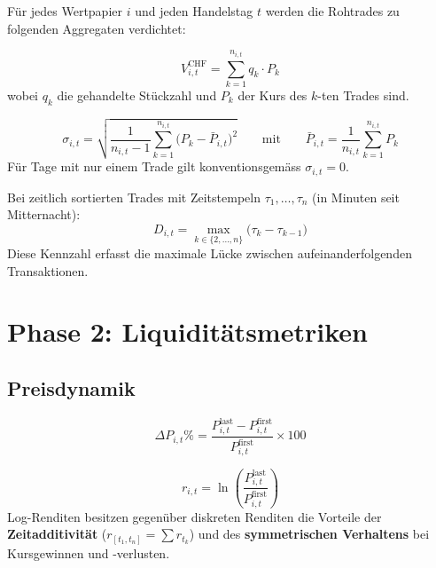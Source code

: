 \documentclass[11pt, a4paper, oneside, openany]{report}
\begin{document}
Für jedes Wertpapier $i$ und jeden Handelstag $t$ werden die Rohtrades zu folgenden Aggregaten verdichtet:

\begin{mathbox}
\[
  V_{i,t}^{\text{CHF}} = \sum_{k=1}^{n_{i,t}} q_k \cdot P_k
\]
wobei $q_k$ die gehandelte Stückzahl und $P_k$ der Kurs des $k$-ten Trades sind.
\end{mathbox}

\begin{mathbox}
\[
  \sigma_{i,t} = \sqrt{\frac{1}{n_{i,t}-1}\sum_{k=1}^{n_{i,t}}\bigl(P_k - \bar{P}_{i,t}\bigr)^2}
  \qquad \text{mit} \qquad
  \bar{P}_{i,t} = \frac{1}{n_{i,t}}\sum_{k=1}^{n_{i,t}} P_k
\]
Für Tage mit nur einem Trade gilt konventionsgemäss $\sigma_{i,t} = 0$.
\end{mathbox}

\begin{mathbox}
Bei zeitlich sortierten Trades mit Zeitstempeln $\tau_1, \ldots, \tau_{n}$ (in Minuten seit Mitternacht):
\[
  D_{i,t} = \max_{k \in \{2,\ldots,n\}} \bigl(\tau_k - \tau_{k-1}\bigr)
\]
Diese Kennzahl erfasst die maximale Lücke zwischen aufeinanderfolgenden Transaktionen.
\end{mathbox}

\section{Phase 2: Liquiditätsmetriken}

\subsection{Preisdynamik}

\begin{mathbox}
\[
  \Delta P_{i,t}\% = \frac{P_{i,t}^{\text{last}} - P_{i,t}^{\text{first}}}{P_{i,t}^{\text{first}}} \times 100
\]
\end{mathbox}

\begin{mathbox}
\[
  r_{i,t} = \ln\!\left(\frac{P_{i,t}^{\text{last}}}{P_{i,t}^{\text{first}}}\right)
\]
Log-Renditen besitzen gegenüber diskreten Renditen die Vorteile der \textbf{Zeitadditivität} ($r_{[t_1, t_n]} = \sum r_{t_k}$) und des \textbf{symmetrischen Verhaltens} bei Kursgewinnen und -verlusten.
\end{mathbox}
\end{document}
